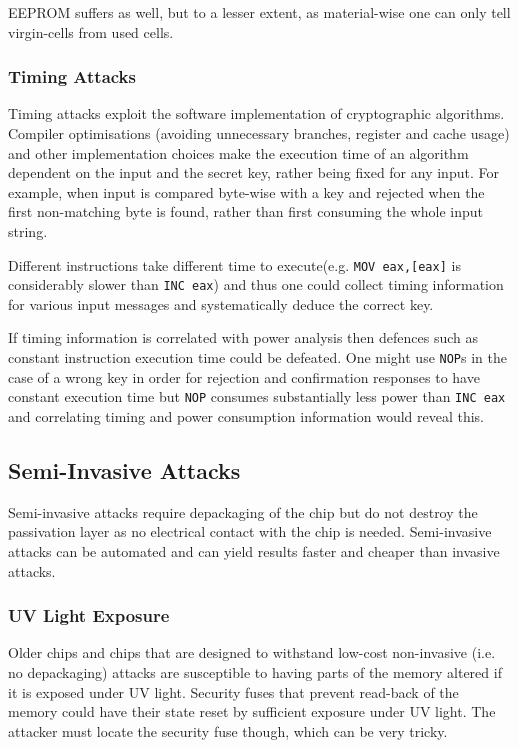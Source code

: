 \documentclass[10pt,a4paper,twocolumn]{article}
\begin{document}
	EEPROM suffers as well, but to a lesser extent, as material-wise one can only tell virgin-cells from used cells\citep{sergei:thesis}. 
	
	\subsubsection{Timing Attacks}
	Timing attacks exploit the software implementation of cryptographic algorithms. Compiler optimisations (avoiding unnecessary branches, register and cache usage) and other implementation choices make the execution time of an algorithm dependent on the input and the secret key, rather being fixed for any input. For example, when input is compared byte-wise with a key and rejected when the first non-matching byte is found, rather than first consuming the whole input string.
	
	Different instructions take different time to execute(e.g. \texttt{MOV eax,[eax]} is considerably slower than \texttt{INC eax}) and thus one could collect timing information for various input messages and systematically deduce the correct key. 
	
	If timing information is correlated with power analysis then defences such as constant instruction execution time could be defeated. One might use \texttt{NOP}s in the case of a wrong key in order for rejection and confirmation responses to have constant execution time but \texttt{NOP} consumes substantially less power than \texttt{INC eax} and correlating timing and power consumption information would reveal this.

	\subsection{Semi-Invasive Attacks}
	Semi-invasive attacks require depackaging of the chip but do not destroy the passivation layer as no electrical contact with the chip is needed. Semi-invasive attacks can be automated and can yield results faster and cheaper than invasive attacks.
	
	\subsubsection{UV Light Exposure}
	Older chips and chips that are designed to withstand low-cost non-invasive (i.e. no depackaging) attacks are susceptible to having parts of the memory altered if it is exposed under UV light. Security fuses that prevent read-back of the memory could have their state reset by sufficient exposure under UV light. The attacker must locate the security fuse though, which can be very tricky. 
\end{document}
